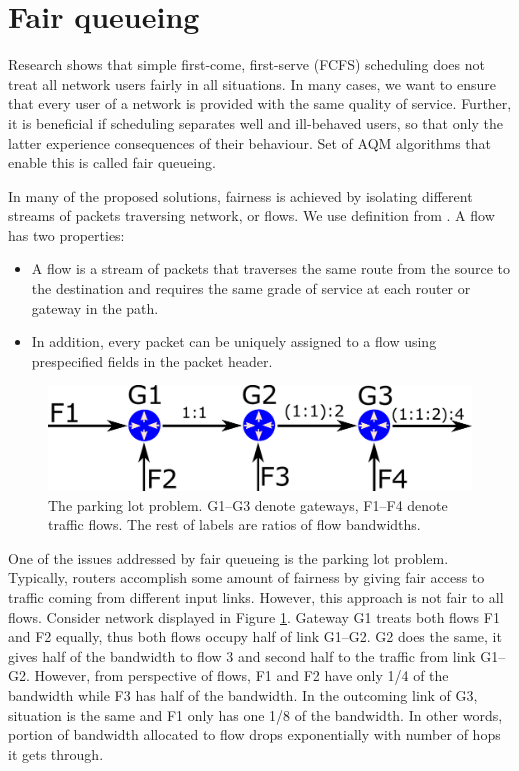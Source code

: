 \section{Fair queueing}

Research shows \cite{Nagle:FQ} that simple first-come, first-serve (FCFS) scheduling does not treat all network users fairly in all situations. In many cases, we want to ensure that every user of a network is provided with the same quality of service. Further, it is beneficial if scheduling separates well and ill-behaved users, so that only the latter experience consequences of their behaviour. Set of AQM algorithms that enable this is called fair queueing.

In many of the proposed solutions, fairness is achieved by isolating different streams of packets traversing network, or flows. We use definition from \cite{Zhang:1990:VCN:99517.99525}. A flow has two properties:
\begin{itemize}
	\item A flow is a stream of packets that traverses the same route from the source to the destination and requires the same grade of service at each router or gateway in the path.
	\item In addition, every packet can be uniquely assigned to a flow using prespecified fields in the packet header.
\end{itemize}
 
\begin{figure}
	\centering
	\includegraphics[width=137mm]{drawings/parking_lot}
	\caption{The parking lot problem. G1--G3 denote gateways, F1--F4 denote traffic flows. The rest of labels are ratios of flow bandwidths.}
	
	\label{fig05:ParkingLot}
\end{figure}

One of the issues addressed by fair queueing is the parking lot problem. Typically, routers accomplish some amount of fairness by giving fair access to traffic coming from different input links. However, this approach is not fair to all flows. Consider network displayed in Figure \ref{fig05:ParkingLot}. Gateway G1 treats both flows F1 and F2 equally, thus both flows occupy half of link G1--G2. G2 does the same, it gives half of the bandwidth to flow 3 and second half to the traffic from link G1--G2. However, from perspective of flows, F1 and F2 have only 1/4 of the bandwidth while F3 has half of the bandwidth. In the outcoming link of G3, situation is the same and F1 only has one 1/8 of the bandwidth. In other words, portion of bandwidth allocated to flow drops exponentially with number of hops it gets through.

